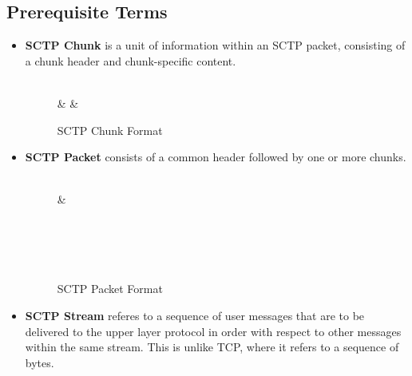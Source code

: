 \documentclass[a4paper,11pt]{article}
\begin{document}
\subsection{Prerequisite Terms}
\begin{itemize}
\item \textbf{SCTP Chunk} is a unit of information within an SCTP packet,
consisting of a chunk header and chunk-specific content.

\begin{figure}[h]
	\centering
	\begin{bytefield}[bitwidth=1.1em]{32}
	\\
	 &  & \\
	\end{bytefield}
	\caption{SCTP Chunk Format}
\end{figure}

\item \textbf{SCTP Packet} consists of a common header followed by one or
	more chunks.
\begin{figure}[h]
	\centering
	\begin{bytefield}[bitwidth=1.1em]{32}
	\\
	 & \\
	\\
	\\
	\\
	\\
	\end{bytefield}
	\caption{SCTP Packet Format}
\end{figure}

\item \textbf{SCTP Stream} referes to a sequence of user messages that are to be
	delivered to the upper layer protocol in order with respect to other
	messages within the same stream. This is unlike TCP, where it refers
	to a sequence of bytes.
\end{itemize}


\clearpage
\end{document}
